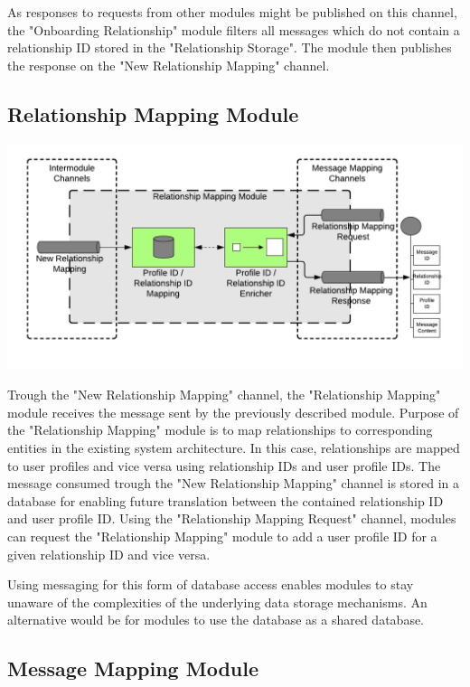 As responses to requests from other modules might be published on this channel, the "Onboarding Relationship" module filters all messages which do not contain a relationship ID stored in the "Relationship Storage". The module then publishes the response on the "New Relationship Mapping" channel.

\subsection{Relationship Mapping Module}

\begin{center}
    \includegraphics[scale=0.6]{Diagrams/Integration Architecture 1/Technological Integration/9. Relationship Mapping.pdf}
\end{center}

Trough the "New Relationship Mapping" channel, the "Relationship Mapping" module receives the message sent by the previously described module. Purpose of the "Relationship Mapping" module is to map relationships to corresponding entities in the existing system architecture. In this case, relationships are mapped to user profiles and vice versa using relationship IDs and user profile IDs. The message consumed trough the "New Relationship Mapping" channel is stored in a database for enabling future translation between the contained relationship ID and user profile ID. Using the "Relationship Mapping Request" channel, modules can request the "Relationship Mapping" module to add a user profile ID for a given relationship ID and vice versa.

Using messaging for this form of database access enables modules to stay unaware of the complexities of the underlying data storage mechanisms. An alternative would be for modules to use the database as a shared database.

\subsection{Message Mapping Module}

